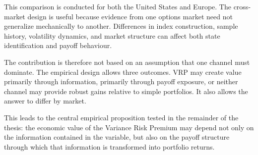 This comparison is conducted for both the United States and Europe. The cross-market design is useful because evidence from one options market need not generalize mechanically to another. Differences in index construction, sample history, volatility dynamics, and market structure can affect both state identification and payoff behaviour.

The contribution is therefore not based on an assumption that one channel must dominate. The empirical design allows three outcomes. VRP may create value primarily through information, primarily through payoff exposure, or neither channel may provide robust gains relative to simple portfolios. It also allows the answer to differ by market.

This leads to the central empirical proposition tested in the remainder of the thesis: the economic value of the Variance Risk Premium may depend not only on the information contained in the variable, but also on the payoff structure through which that information is transformed into portfolio returns.
